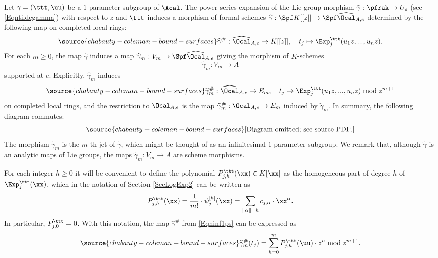 Let $\gamma=(\ttt,\uu)$ be a $1$-parameter subgroup of $\Acal$. The power series expansion of the Lie group morphism $\tilde{\gamma}:\pfrak\to U_e$ (see \eqref{Eqntildegamma}) with respect to $z$ and $\ttt$ induces a morphism of formal schemes $\widehat{\gamma}: \Spf K[[z]]\to  \Spf \widehat{\Ocal}_{A,e}$ determined by the following map on completed local rings:
\begin{equation}\label{Eqnhatgamma}
\source{chabauty-coleman-bound-surfaces}
\widehat{\gamma}^\#: \widehat{\Ocal}_{A,e}\to K[[z]], \quad t_j\mapsto \Exp^\ttt_j(u_1z,...,u_nz).
\end{equation}
For each $m\ge 0$, the map $\widehat{\gamma}$ induces a map $\widehat{\gamma}_m:V_m\to \Spf  \widehat{\Ocal}_{A,e}$ giving the morphism of $K$-schemes
$$
\tilde{\gamma}_m:V_m\to A
$$
supported at $e$. Explicitly, $\widehat{\gamma}_m$ induces
\begin{equation}\label{Eqninf1ps}
\source{chabauty-coleman-bound-surfaces}
\widehat{\gamma}_m^\#: \widehat{\Ocal}_{A,e}\to E_m, \quad t_j\mapsto \Exp^\ttt_j(u_1z,...,u_nz)\bmod z^{m+1}
\end{equation}
on completed local rings, and the restriction to $\Ocal_{A,e}$ is the map $\tilde{\gamma}_m^\#:\Ocal_{A,e}\to E_m$ induced by $\tilde{\gamma}_m$. In summary, the following diagram commutes:
\begin{equation}\label{Eqngammas}
\source{chabauty-coleman-bound-surfaces}
\text{[Diagram omitted; see source PDF.]}
\end{equation}
The morphism $\tilde{\gamma}_m$ is the $m$-th jet of $\tilde{\gamma}$, which might be thought of as an infinitesimal $1$-parameter subgroup. We remark that, although $\tilde{\gamma}$ is an analytic maps of Lie groups, the maps $\tilde{\gamma}_m:V_m\to A$ are scheme morphisms.

For each integer $h\ge 0$ it will be convenient to define the polynomial $P^{\ttt}_{j,h}(\xx)\in K[\xx]$ as the homogeneous part of degree $h$ of $\Exp^\ttt_j(\xx)$, which in the notation of Section \ref{SecLogExp2} can be written as
$$
P^{\ttt}_{j,h}(\xx)=\frac{1}{m!}\cdot \psi^{[h]}_j(\xx)=\sum_{\|\alpha\|=h} c_{j,\alpha}\cdot \xx^\alpha.
$$
In particular, $P^\ttt_{j,0}=0$. With this notation, the map $\widehat{\gamma}^\#$ from \eqref{Eqninf1ps} can be expressed as
\begin{equation}\label{Eqninf1psP}
\source{chabauty-coleman-bound-surfaces}
\widehat{\gamma}^\#_m(t_j)=\sum_{h=0}^{m} P^\ttt_{j,h}(\uu)\cdot z^h\bmod z^{m+1}.
\end{equation}

